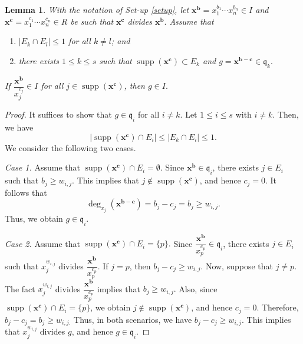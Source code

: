 \documentclass[12pt,reqno]{amsart}
\newtheorem{lemma}[thm]{Lemma}
\theoremstyle{definition}
\newcommand{\q}{\mathfrak{q}}
\newcommand{\x}{\mathbf{x}}
\newcommand{\bb}{\mathbf{b}}
\newcommand{\bc}{\mathbf{c}}
\newcommand{\supp}[1]{\operatorname{supp}\left(#1\right)}
\numberwithin{equation}{section}
\begin{document}
\begin{lemma}\label{L-Tool01}
    With the notation of Set-up \ref{setup}, let $\x^{\bb} = x_1^{b_1} \cdots x_n^{b_n} \in I$ and $\x^{\bc} = x_1^{c_1} \cdots x_n^{c_n} \in R$ be such that $\x^{\bc}$ divides $\x^{\bb}.$ Assume that
    \begin{enumerate}[\rm(i)]
        \item $|E_k \cap E_l| \le 1$ for all $k \ne l$; and

        \item there exists $1 \le k \le s$ such that $\supp{\x^{\bc}} \subset E_k$ and $g = \x^{\bb - \bc} \in \q_k.$
    \end{enumerate}
    If $\dfrac{\x^{\bb}}{x_j^{c_j}} \in I$ for all $j \in \supp{\x^{\bc}}$, then $g \in I.$
\end{lemma}

\begin{proof}
    It suffices to show that $g \in \q_i$ for all $i \ne k.$ Let $1 \le i \le s$ with $i \ne k.$ Then, we have
    \[|\supp{\x^\bc} \cap E_i| \le |E_k \cap E_i| \le 1.\] 
    We consider the following two cases.

    \medskip\noindent
    \textit{Case 1.} Assume that $\supp{\x^{\bc}} \cap E_i = \emptyset.$ Since $\x^\bb \in \q_i$, there exists $j \in E_i$ such that $b_j \ge w_{i, j}.$ This implies that $j \notin \supp{\x^\bc}$, and hence $c_j = 0.$ It follows that 
    \[\deg_{x_j}(\x^{\bb - \bc}) = b_j - c_j = b_j \ge w_{i, j}.\]
    Thus, we obtain $g \in \q_i.$ 

    \medskip\noindent
    \textit{Case 2.} Assume that $\supp{\x^{\bc}} \cap E_i = \{p\}.$ Since $\dfrac{\x^{\bb}}{x_p^{c_p}} \in \q_i$, there exists $j \in E_i$ such that $x_j^{w_{i, j}}$ divides $\dfrac{\x^{\bb}}{x_p^{c_p}}.$ If $j = p$, then $b_j - c_j \ge w_{i, j}.$ Now, suppose that $j \ne p.$ The fact $x_j^{w_{i, j}}$ divides $\dfrac{\x^{\bb}}{x_p^{c_p}}$ implies that $b_j \ge w_{i,j}.$ Also, since $\supp{\x^{\bc}} \cap E_i = \{p\}$, we obtain $j \notin \supp{\x^{\bc}}$, and hence $c_j = 0.$ Therefore, $b_j-c_j=b_j \ge w_{i,j.}$ Thus, in both scenarios, we have $b_j - c_j \ge w_{i, j}.$ This implies that $x_j^{w_{i, j}}$ divides $g$, and hence $g \in \q_i.$ 
\end{proof}
\end{document}
